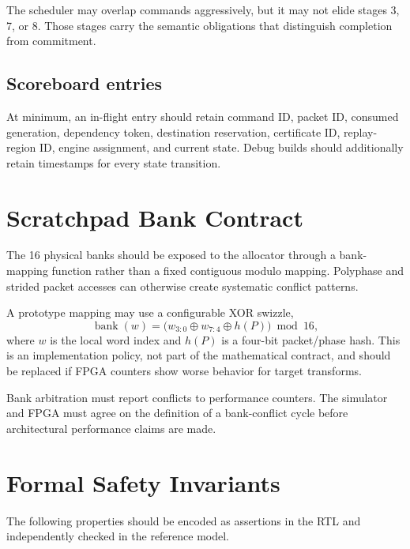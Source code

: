 \documentclass[10pt,letterpaper]{article}
\begin{document}
{{{The scheduler may overlap commands aggressively, but it may not elide stages 3, 7, or 8. Those stages carry the semantic obligations that distinguish completion from commitment.

\subsection{Scoreboard entries}

At minimum, an in-flight entry should retain command ID, packet ID, consumed generation, dependency token, destination reservation, certificate ID, replay-region ID, engine assignment, and current state. Debug builds should additionally retain timestamps for every state transition.

\section{Scratchpad Bank Contract}

The 16 physical banks should be exposed to the allocator through a bank-mapping function rather than a fixed contiguous modulo mapping. Polyphase and strided packet accesses can otherwise create systematic conflict patterns.

A prototype mapping may use a configurable XOR swizzle,
\[
\operatorname{bank}(w)=
\bigl(w_{3:0}\oplus w_{7:4}\oplus h(P)\bigr)\bmod 16,
\]
where $w$ is the local word index and $h(P)$ is a four-bit packet/phase hash. This is an implementation policy, not part of the mathematical contract, and should be replaced if FPGA counters show worse behavior for target transforms.

Bank arbitration must report conflicts to performance counters. The simulator and FPGA must agree on the definition of a bank-conflict cycle before architectural performance claims are made.

\section{Formal Safety Invariants}

The following properties should be encoded as assertions in the RTL and independently checked in the reference model.

}}}
\end{document}
